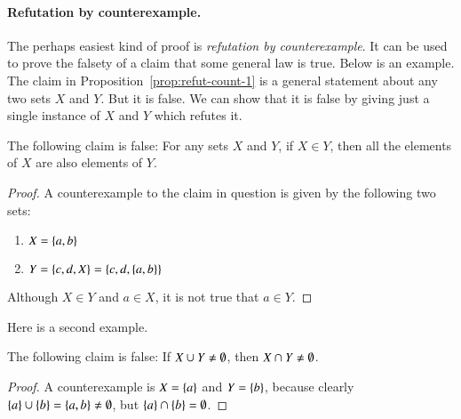\documentclass[nobib,nofonts]{tufte-handout}
\begin{document}
\paragraph{Refutation by counterexample.}

The perhaps easiest kind of proof is \emph{refutation by counterexample}.
It can be used to prove the falsety of a claim that some general law is true.
Below is an example.
The claim in Proposition~\ref{prop:refut-count-1} is a general statement about any two sets $X$ and $Y$.
But it is false.
We can show that it is false by giving just a single instance of $X$ and $Y$ which refutes
it.

\begin{proposition}
  \label{prop:refut-count-1}
  The following claim is false: For any sets $X$ and $Y$, if $X \in Y$, then all the elements of $X$ are also elements of $Y$.
\end{proposition}

\begin{proof}
  A counterexample to the claim in question is given by the following two sets:
  \begin{enumerate}[]
    \item $X = \left\{a,b\right\}$
    \item $Y = \left\{c, d, X\right\} = \left\{c, d, \left\{a,b\right\}\right\}$
  \end{enumerate}
  Although $X \in Y$ and $a \in X$, it is not true that $a \in Y$.
\end{proof}

Here is a second example.

\begin{proposition}
  The following claim is false: If $X \cup Y \neq \emptyset$, then $X \cap Y \neq \emptyset$.
\end{proposition}

\begin{proof}
  A counterexample is $X = \left\{a\right\}$ and $Y=\left\{b\right\}$, because clearly $\left\{a\right\} \cup \left\{b\right\} = \left\{a,b\right\} \neq \emptyset$, but $\left\{a\right\} \cap \left\{b\right\} = \emptyset$.
\end{proof}
\end{document}
